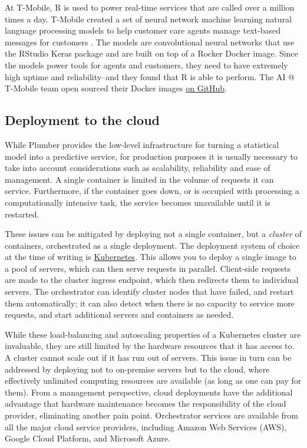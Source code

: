 At T-Mobile, R is used to power real-time services that are called over
a million times a day. T-Mobile created a set of neural network machine
learning natural language processing models to help customer care agents
manage text-based messages for customers
\citep{t-mobile_enterprise_2018}. The models are convolutional neural
networks that use the RStudio Keras package and are built on top of a
Rocker Docker image. Since the models power tools for agents and
customers, they need to have extremely high uptime and reliability--and
they found that R is able to perform. The AI @ T-Mobile team open
sourced their Docker images
\href{https://github.com/tmobile/r-tensorflow-api}{on GitHub}.

\hypertarget{deployment-to-the-cloud}{%
\subsection{Deployment to the cloud}\label{deployment-to-the-cloud}}

While Plumber provides the low-level infrastructure for turning a
statistical model into a predictive service, for production purposes it
is usually necessary to take into account considerations such as
scalability, reliability and ease of management. A single container is
limited in the volume of requests it can service. Furthermore, if the
container goes down, or is occupied with processing a computationally
intensive task, the service becomes unavailable until it is restarted.

These issues can be mitigated by deploying not a single container, but a
\emph{cluster} of containers, orchestrated as a single deployment. The
deployment system of choice at the time of writing is
\href{https://kubernetes.io}{Kubernetes}. This allows you to deploy a
single image to a pool of servers, which can then serve requests in
parallel. Client-side requests are made to the cluster ingress endpoint,
which then redirects them to individual servers. The orchestrator can
identify cluster nodes that have failed, and restart them automatically;
it can also detect when there is no capacity to service more requests,
and start additional servers and containers as needed.

While these load-balancing and autoscaling properties of a Kubernetes
cluster are invaluable, they are still limited by the hardware resources
that it has access to. A cluster cannot scale out if it has run out of
servers. This issue in turn can be addressed by deploying not to
on-premise servers but to the cloud, where effectively unlimited
computing resources are available (as long as one can pay for them).
From a management perspective, cloud deployments have the additional
advantage that hardware maintenance becomes the responsibility of the
cloud provider, eliminating another pain point. Orchestrator services
are available from all the major cloud service providers, including
Amazon Web Services (AWS), Google Cloud Platform, and Microsoft Azure.

